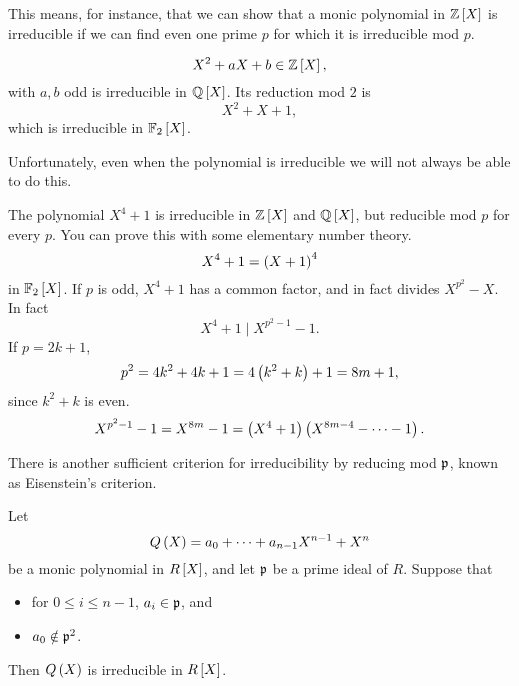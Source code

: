 This means, for instance, that we can show that a monic polynomial in $ \Z\sb{X} $ is irreducible if we can find even one prime $ p $ for which it is irreducible mod $ p $.

\begin{example*}
$$ X^2 + aX + b \in \Z\sb{X}, $$
with $ a, b $ odd is irreducible in $ \Q\sb{X} $. Its reduction mod $ 2 $ is
$$ X^2 + X + 1, $$
which is irreducible in $ \F_2\sb{X} $.
\end{example*}

Unfortunately, even when the polynomial is irreducible we will not always be able to do this.

\begin{example*}
The polynomial $ X^4 + 1 $ is irreducible in $ \Z\sb{X} $ and $ \Q\sb{X} $, but reducible mod $ p $ for every $ p $. You can prove this with some elementary number theory.
$$ X^4 + 1 = \rb{X + 1}^4 $$
in $ \F_2\sb{X} $. If $ p $ is odd, $ X^4 + 1 $ has a common factor, and in fact divides $ X^{p^2} - X $. In fact
$$ X^4 + 1 \mid X^{p^2 - 1} - 1. $$
If $ p = 2k + 1 $,
$$ p^2 = 4k^2 + 4k + 1 = 4\rb{k^2 + k} + 1 = 8m + 1, $$
since $ k^2 + k $ is even.
$$ X^{p^2 - 1} - 1 = X^{8m} - 1 = \rb{X^4 + 1}\rb{X^{8m - 4} - \dots - 1}. $$
\end{example*}

There is another sufficient criterion for irreducibility by reducing mod $ \pp $, known as Eisenstein's criterion.

\begin{proposition}
Let
$$ Q\rb{X} = a_0 + \dots + a_{n - 1}X^{n - 1} + X^n $$
be a monic polynomial in $ R\sb{X} $, and let $ \pp $ be a prime ideal of $ R $. Suppose that
\begin{itemize}
\item for $ 0 \le i \le n - 1 $, $ a_i \in \pp $, and
\item $ a_0 \notin \pp^2 $.
\end{itemize}
Then $ Q\rb{X} $ is irreducible in $ R\sb{X} $.
\end{proposition}

\pagebreak

